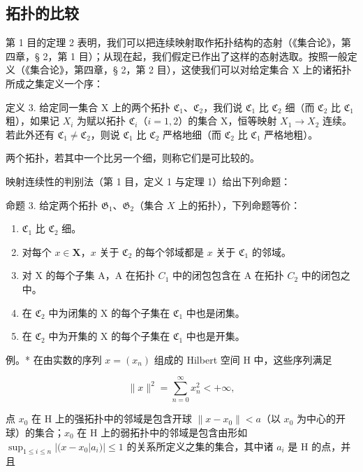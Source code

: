 \subsection{拓扑的比较}

第 1 目的定理 2 表明，我们可以把连续映射取作拓扑结构的态射（《集合论》，第四章，§ 2，第 1 目）；从现在起，我们假定已作出了这样的态射选取。按照一般定义（《集合论》，第四章，§ 2，第 2 目），这使我们可以对给定集合 X 上的诸拓扑所成之集定义一个序：

定义 3. 给定同一集合 X 上的两个拓扑 \(\mathfrak{C}_1\)、\(\mathfrak{C}_2\)，我们说 \(\mathfrak{C}_1\) 比 \(\mathfrak{C}_2\) 细（而 \(\mathfrak{C}_2\) 比 \(\mathfrak{C}_1\) 粗），如果记 \(X_i\) 为赋以拓扑 \(\mathfrak{C}_i\)（\(i = 1, 2\)）的集合 X，恒等映射 \(X_1 \to X_2\) 连续。若此外还有 \(\mathfrak{C}_1 \neq \mathfrak{C}_2\)，则说 \(\mathfrak{C}_1\) 比 \(\mathfrak{C}_2\) 严格地细（而 \(\mathfrak{C}_2\) 比 \(\mathfrak{C}_1\) 严格地粗）。

两个拓扑，若其中一个比另一个细，则称它们是可比较的。

映射连续性的判别法（第 1 目，定义 1 与定理 1）给出下列命题：

命题 3. 给定两个拓扑 \(\mathfrak{G}_1\)、\(\mathfrak{G}_2\)（集合 \(X\) 上的拓扑），下列命题等价：

\begin{enumerate}
\def\labelenumi{\alph{enumi})}
\item
  \(\mathfrak{C}_1\) 比 \(\mathfrak{C}_2\) 细。
\item
  对每个 \(x \in \mathbf{X}\)，\(x\) 关于 \(\mathfrak{C}_2\) 的每个邻域都是 \(x\) 关于 \(\mathfrak{C}_1\) 的邻域。
\item
  对 X 的每个子集 A，A 在拓扑 \(C_{1}\) 中的闭包包含在 A 在拓扑 \(C_{2}\) 中的闭包之中。
\item
  在 \(\mathfrak{C}_{2}\) 中为闭集的 X 的每个子集在 \(\mathfrak{C}_{1}\) 中也是闭集。
\item
  在 \(\mathfrak{C}_{2}\) 中为开集的 X 的每个子集在 \(\mathfrak{C}_{1}\) 中也是开集。
\end{enumerate}

例。* 在由实数的序列 \(x = (x_n)\) 组成的 Hilbert 空间 H 中，这些序列满足

\[
\| x \| ^ {2} = \sum_ {n = 0} ^ {\infty} x _ {n} ^ {2} <   + \infty ,
\]

点 \(x_0\) 在 H 上的强拓扑中的邻域是包含开球 \(\|x - x_0\| < a\)（以 \(x_0\) 为中心的开球）的集合；\(x_0\) 在 H 上的弱拓扑中的邻域是包含由形如 \(\sup_{1 \leqslant i \leqslant n} |(x - x_0|a_i)| \leqslant 1\) 的关系所定义之集的集合，其中诸 \(a_i\) 是 H 的点，并且

